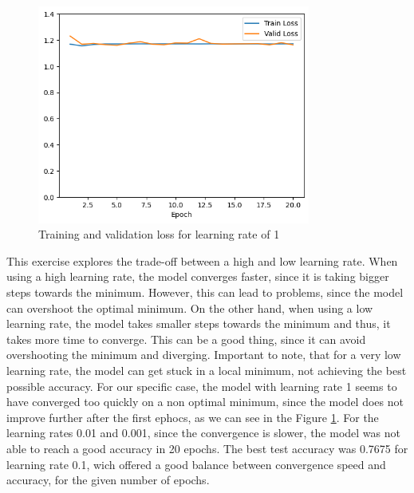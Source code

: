 \documentclass{article}
\begin{document}
\begin{figure}[H]
    \centering
    \includegraphics[width=0.8\textwidth]{"plots/mlp-training-loss-batch-16-lr-1.0-epochs-20-hidden-200-dropout-0.0-l2-0-layers-2-act-relu-opt-sgd.png"}
    \caption{Training and validation loss for learning rate of 1}
    \label{2.2b learning rate 1}
\end{figure}

This exercise explores the trade-off between a high and low learning rate. When using a high learning rate, the model converges faster, since it is taking bigger steps towards the minimum. 
However, this can lead to problems, since the model can overshoot the optimal minimum. On the other hand, when using a low learning rate, the model takes smaller steps towards 
the minimum and thus, it takes more time to converge. This can be a good thing, since it can avoid overshooting the minimum and diverging. Important to note, that for a very low learning rate,
the model can get stuck in a local minimum, not achieving the best possible accuracy. For our specific case, the model with learning rate 1 seems to have converged too quickly on a non optimal minimum,
since the model does not improve further after the first ephocs, as we can see in the Figure \ref{2.2b learning rate 1}. For the learning rates 0.01 and 0.001, since the convergence is slower, 
the model was not able to reach a good accuracy in 20 epochs. The best test accuracy was 0.7675 for learning rate 0.1, wich offered a good balance between convergence speed and accuracy, for the given number of epochs.

\subsubsection{}
\end{document}
